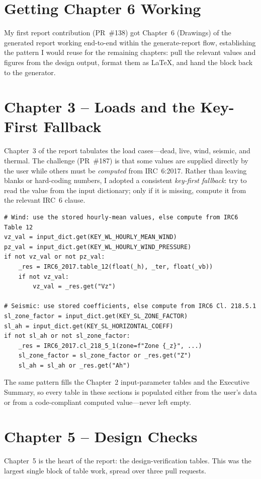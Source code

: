 \section{Getting Chapter 6 Working}
My first report contribution (PR~\#138) got Chapter~6 (Drawings) of the generated report
working end-to-end within the generate-report flow, establishing the pattern I would reuse for
the remaining chapters: pull the relevant values and figures from the design output, format them
as LaTeX, and hand the block back to the generator.

\section{Chapter 3 -- Loads and the Key-First Fallback}
Chapter~3 of the report tabulates the load cases---dead, live, wind, seismic, and thermal. The
challenge (PR~\#187) is that some values are supplied directly by the user while others must be
\emph{computed} from IRC~6:2017. Rather than leaving blanks or hard-coding numbers, I adopted a
consistent \emph{key-first fallback}: try to read the value from the input dictionary; only if
it is missing, compute it from the relevant IRC~6 clause.

\begin{lstlisting}[caption={Key-first fallback for wind and seismic values (\texttt{report\_generator.py}, \texttt{ch3\_loads}).},label={lst:fallback}]
# Wind: use the stored hourly-mean values, else compute from IRC6 Table 12
vz_val = input_dict.get(KEY_WL_HOURLY_MEAN_WIND)
pz_val = input_dict.get(KEY_WL_HOURLY_WIND_PRESSURE)
if not vz_val or not pz_val:
    _res = IRC6_2017.table_12(float(_h), _ter, float(_vb))
    if not vz_val:
        vz_val = _res.get("Vz")

# Seismic: use stored coefficients, else compute from IRC6 Cl. 218.5.1
sl_zone_factor = input_dict.get(KEY_SL_ZONE_FACTOR)
sl_ah = input_dict.get(KEY_SL_HORIZONTAL_COEFF)
if not sl_ah or not sl_zone_factor:
    _res = IRC6_2017.cl_218_5_1(zone=f"Zone {_z}", ...)
    sl_zone_factor = sl_zone_factor or _res.get("Z")
    sl_ah = sl_ah or _res.get("Ah")
\end{lstlisting}

The same pattern fills the Chapter~2 input-parameter tables and the Executive Summary, so every
table in these sections is populated either from the user's data or from a code-compliant
computed value---never left empty.

\section{Chapter 5 -- Design Checks}
Chapter~5 is the heart of the report: the design-verification tables. This was the largest
single block of table work, spread over three pull requests.


